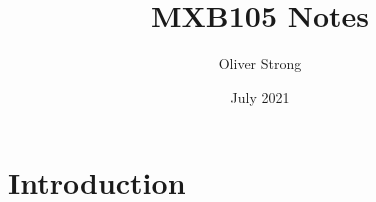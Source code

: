 \documentclass{article}
\title{MXB105 Notes}
\author{Oliver Strong}
\date{July 2021}
\begin{document}
\maketitle

\section{Introduction}
\end{document}
